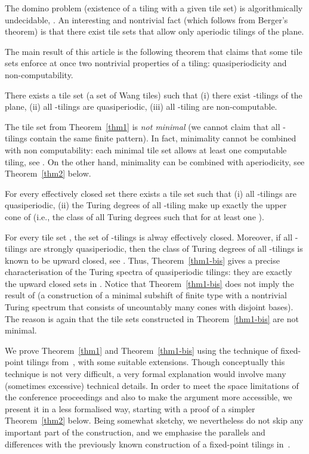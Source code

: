 \documentclass[runningheads]{llncs}
\begin{document}
The domino problem (existence of a tiling with a given tile set) is algorithmically undecidable, \cite{berger}.  An interesting and nontrivial fact (which follows from Berger's theorem) is that there exist tile sets that allow only aperiodic tilings of the plane.

The main result of this article is the following theorem that claims that some tile sets enforce at once two nontrivial properties of a tiling: 
quasiperiodicity and non-computability.
\begin{theorem}\label{thm1}
There exists a tile set \textup(a set of Wang tiles\textup)  such that 
(i) there exist -tilings of the plane,
(ii) all -tilings are quasiperiodic,
(iii) all -tiling are non-computable.
\end{theorem}
The tile set from Theorem~\ref{thm1} is \emph{not minimal} (we cannot claim that all -tilings contain the same finite pattern). In fact, minimality cannot be combined with non computability: each minimal tile set allows at least one computable tiling, see \cite{ballier-jeandel}.
On the other hand, minimality can be combined with aperiodicity, see Theorem~\ref{thm2} below.


\begin{theorem}\label{thm1-bis}
For every effectively closed set   there exists a tile set  such that 
(i) all -tilings are quasiperiodic,
(ii) the Turing degrees of all -tiling make up exactly the upper cone of   (i.e.,  the class of all Turing degrees  such that  for at least one ).

\end{theorem}
For every tile set , the set of -tilings is alway effectively closed. Moreover, if all -tilings are strongly quasiperiodic, then the class of Turing degrees of all -tilings is known to be upward closed, see \cite{pascal2}. Thus, Theorem~\ref{thm1-bis} gives a precise characterisation of the Turing spectra of quasiperiodic tilings: they are exactly the upward closed sets in .
Notice that Theorem~\ref{thm1-bis} does not imply the result of \cite{pascal3} (a construction of a minimal subshift of finite type with a nontrivial Turing spectrum that consists of uncountably many cones with disjoint bases). The reason is again that the tile sets constructed in Theorem~\ref{thm1-bis} are not minimal.


We prove Theorem~\ref{thm1} and Theorem~\ref{thm1-bis} using the technique of fixed-point tilings from~\cite{drs}, with some suitable extensions. Though conceptually this technique is  not very difficult,  a very formal explanation would involve many (sometimes excessive) technical  details. 
In order to meet the space limitations of the conference proceedings and also to make the argument more accessible, we present it in a less formalised way, starting with a proof of a simpler Theorem~\ref{thm2} below. Being somewhat sketchy, we nevertheless do not skip any important part of the construction, and  we emphasise the parallels and differences with the previously known construction of a  fixed-point tilings in~\cite{drs}.
\end{document}
